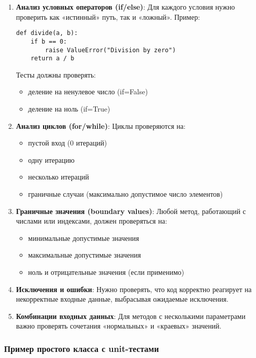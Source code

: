 \begin{enumerate}
    \item \textbf{Анализ условных операторов (if/else)}:  
    Для каждого условия нужно проверить как «истинный» путь, так и «ложный».  
    Пример:  
    \begin{verbatim}
def divide(a, b):
    if b == 0:
        raise ValueError("Division by zero")
    return a / b
    \end{verbatim}  
    Тесты должны проверять:
    \begin{itemize}
        \item деление на ненулевое число (if=False)
        \item деление на ноль (if=True)
    \end{itemize}

    \item \textbf{Анализ циклов (for/while)}:  
    Циклы проверяются на:
    \begin{itemize}
        \item пустой вход (0 итераций)
        \item одну итерацию
        \item несколько итераций
        \item граничные случаи (максимально допустимое число элементов)
    \end{itemize}

    \item \textbf{Граничные значения (boundary values)}:  
    Любой метод, работающий с числами или индексами, должен проверяться на:
    \begin{itemize}
        \item минимальные допустимые значения
        \item максимальные допустимые значения
        \item ноль и отрицательные значения (если применимо)
    \end{itemize}

    \item \textbf{Исключения и ошибки}:  
    Нужно проверять, что код корректно реагирует на некорректные входные данные, выбрасывая ожидаемые исключения.

    \item \textbf{Комбинации входных данных}:  
    Для методов с несколькими параметрами важно проверять сочетания «нормальных» и «краевых» значений.
\end{enumerate}

\subsubsection{Пример простого класса с unit-тестами}


